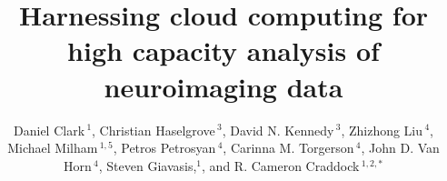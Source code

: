 \documentclass{frontiersSCNS} %
\def\firstAuthorLast{Clark {et~al.}} %
\def\Authors{Daniel Clark\,$^{1}$, Christian Haselgrove\,$^{3}$, David N. Kennedy\,$^{3}$, Zhizhong Liu\,$^{4}$, Michael Milham\,$^{1,5}$, Petros Petrosyan\,$^{4}$, Carinna M. Torgerson\,$^{4}$, John D. Van Horn\,$^{4}$, Steven Giavasis,$^{1}$, and R. Cameron Craddock\,$^{1,2,*}$}
\begin{document}
\onecolumn
{}

\title[Harnessing cloud computing]{Harnessing cloud computing for high capacity analysis of neuroimaging data} 

\author[\firstAuthorLast ]{\Authors} %
\address{} %
\correspondance{} %

\extraAuth{}%


\maketitle

\end{document}
